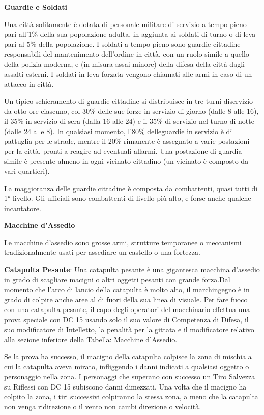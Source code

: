 \documentclass[a4paper,11pt,twoside,openany]{book}
\begin{document}
{\textbf{Guardie e Soldati}

Una città solitamente è dotata di personale militare di servizio a tempo pieno pari all'1\% della sua popolazione adulta, in aggiunta ai soldati di turno o di leva pari al 5\% della popolazione. I soldati a tempo pieno sono guardie cittadine responsabili del mantenimento dell'ordine in città, con un ruolo simile a quello della polizia moderna, e (in misura assai minore) della difesa della città dagli assalti esterni. I soldati in leva forzata vengono chiamati alle armi in caso di un attacco in città.

Un tipico schieramento di guardie cittadine si distribuisce in tre turni diservizio da otto ore ciascuno, col 30\% delle sue forze in servizio di giorno (dalle 8 alle 16), il 35\% in servizio di sera (dalla 16 alle 24) e il 35\% di servizio nel turno di notte (dalle 24 alle 8). In qualsiasi momento, l'80\% delleguardie in servizio è di pattuglia per le strade, mentre il 20\% rimanente è assegnato a varie postazioni per la città, pronti a reagire ad eventuali allarmi. Una postazione di guardia simile è presente almeno in ogni vicinato cittadino (un vicinato è composto da vari quartieri).

La maggioranza delle guardie cittadine è composta da combattenti, quasi tutti di 1° livello. Gli ufficiali sono combattenti di livello più alto, e forse anche qualche incantatore.

\textbf{Macchine d'Assedio}

Le macchine d'assedio sono grosse armi, strutture temporanee o meccanismi tradizionalmente usati per assediare un castello o una fortezza.

\textbf{Catapulta Pesante}: Una catapulta pesante è una gigantesca macchina d'assedio in grado di scagliare macigni o altri oggetti pesanti con grande forza.Dal momento che l'arco di lancio della catapulta è molto alto, il marchingegno è in grado di colpire anche aree al di fuori della sua linea di visuale. Per fare fuoco con una catapulta pesante, il capo degli operatori del macchinario effettua una prova speciale con DC 15 usando solo il suo valore di Competenza di Difesa, il suo modificatore di Intelletto, la penalità per la gittata e il modificatore relativo alla sezione inferiore della Tabella: Macchine d'Assedio. 

Se la prova ha successo, il macigno della catapulta colpisce la zona di mischia a cui la catapulta aveva mirato, infliggendo i danni indicati a qualsiasi oggetto o personaggio nella zona. I personaggi che superano con successo un Tiro Salvezza su Riflessi con DC 15 subiscono danni dimezzati. Una volta che il macigno ha colpito la zona, i tiri successivi colpiranno la stessa zona, a meno che la catapulta non venga ridirezione o il vento non cambi direzione o velocità.

}
\end{document}
